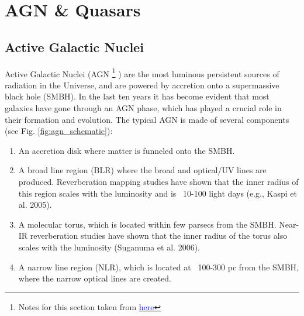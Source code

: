 \chapter{AGN \& Quasars}

\section{Active Galactic Nuclei}

Active Galactic Nuclei (AGN  \footnote{Notes for this section taken from \href{https://www.isdc.unige.ch/~ricci/Website/Active_Galactic_Nuclei.html}{\textcolor{blue}{here}}} ) are the most luminous persistent sources of radiation in the Universe, and are powered by accretion onto a supermassive black hole (SMBH). In the last ten years it has become evident that most galaxies have gone through an AGN phase, which has played a crucial role in their formation and evolution. The typical AGN is made of several components (see Fig. \ref{fig:agn_schematic}):

\begin{enumerate}
    \item An accretion disk where matter is funneled onto the SMBH.
    \item A broad line region (BLR) where the broad and optical/UV lines are produced. Reverberation mapping studies have shown that the inner radius of this region scales with the luminosity and is  ~10-100 light days (e.g., Kaspi et al. 2005).
    \item A molecular torus, which is located within few parsecs from the SMBH. Near-IR reverberation studies have shown that the inner radius of the torus also scales with the luminosity (Suganuma et al. 2006).
    \item A narrow line region (NLR), which is located at ~100-300 pc from the SMBH, where the narrow optical lines are created.

\end{enumerate}


